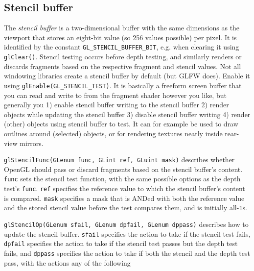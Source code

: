 \documentclass[8pt, table, xcdraw]{article}%
\begin{document}
\subsection{Stencil buffer}

The \emph{stencil buffer} is a two-dimensional buffer with the same dimensions as the viewport that stores an eight-bit value (so 256 values possible) per pixel. It is identified by the constant \lstinline{GL_STENCIL_BUFFER_BIT}, e.g. when clearing it using \lstinline{glClear()}. Stencil testing occurs before depth testing, and similarly renders or discards fragments based on the respective fragment and stencil values. Not all windowing libraries create a stencil buffer by default (but GLFW does). Enable it using \lstinline{glEnable(GL_STENCIL_TEST)}. It is basically a freeform screen buffer that you can read and write to from the fragment shader however you like, but generally you 1) enable stencil buffer writing to the stencil buffer 2) render objects while updating the stencil buffer 3) disable stencil buffer writing 4) render (other) objects using stencil buffer to test. It can for example be used to draw outlines around (selected) objects, or for rendering textures neatly inside rear-view mirrors.

\lstinline{glStencilFunc(GLenum func, GLint ref, GLuint mask)} describes whether OpenGL should pass or discard fragments based on the stencil buffer's content. \lstinline{func} sets the stencil test function, with the same possible options as the depth test's \lstinline{func}. \lstinline{ref} specifies the reference value to which the stencil buffer's content is compared. \lstinline{mask} specifies a mask that is ANDed with both the reference value and the stored stencil value before the test compares them, and is initially all-\lstinline{1}s.


\lstinline{glStencilOp(GLenum sfail, GLenum dpfail, GLenum dppass)} describes how to update the stencil buffer. \lstinline{sfail} specifies the action to take if the stencil test fails, \lstinline{dpfail} specifies the action to take if the stencil test passes but the depth test fails, and \lstinline{dppass} specifies the action to take if both the stencil and the depth test pass, with the actions any of the following
\end{document}
